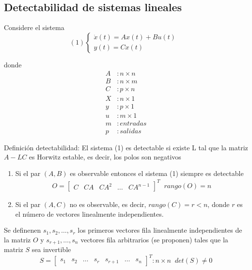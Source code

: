 \subsection{Detectabilidad de sistemas lineales}

Considere el sistema
\[
    (1)
    \left\{
        \begin{array}{lll}
            \dot{x}(t) = Ax(t) + Bu(t)\\
            y(t) = Cx(t)
        \end{array}
    \right. \;\;
\]

donde 
\[
     \begin{split}
        A &: n \times n \\
        B &: n \times m \\
        C &: p \times n \\
        X &: n \times 1 \\
        y &: p \times 1 \\
        u &: m \times 1 \\
        m &: entradas \\
        p &: salidas
    \end{split}
\]

Definición detectabilidad: El sistema (1) es detectable si existe L tal que la matriz \( A-LC \) es Horwitz estable, es decir, los polos son negativos

\begin{enumerate}
    \item Si el par \( (A, B) \) es observable entonces el sistema (1) siempre es detectable
    \[
    \begin{split}
        O = 
        \begin{bmatrix}
            C & CA & CA^{2} & \ldots & CA^{n-1}
        \end{bmatrix}^{T}
         \;\; rango(O)=n
    \end{split}
    \]
    
    \item Si el par \( (A, C) \) no es observable, es decir, \( rango(C)=r<n \), donde \( r \) es el número de vectores linealmente independientes. 
\end{enumerate}

Se definenen \( s_{1}, s_{2}, \ldots, s_{r} \) los primeros vectores fila linealmente independientes de la matriz \( O \) y \( s_{r+1}, \ldots, s_{n} \) vectores fila arbitrarios (se proponen) tales que la matriz \( S \) sea invertible
\[
    S = \begin{bmatrix}
            s_{1} & s_{2} & \ldots & s_{r} & s_{r+1} & \ldots & s_{n}
        \end{bmatrix}^{T}:n \times n \;\; det(S) \not = 0
\]

